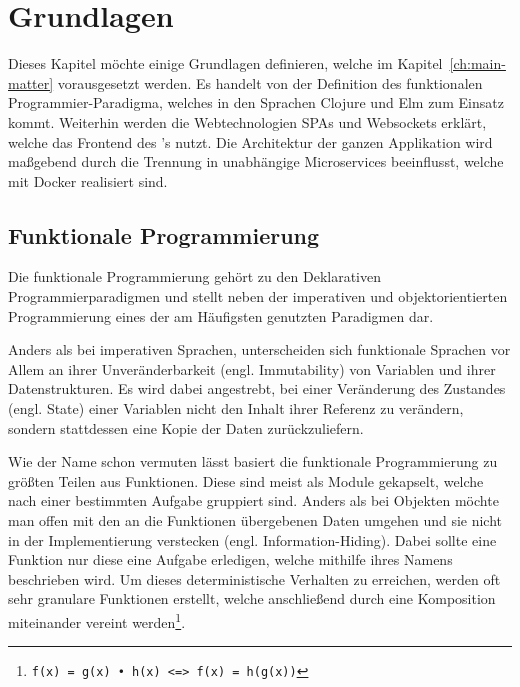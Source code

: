 \chapter{Grundlagen}
\label{ch:fundamentals}

Dieses Kapitel möchte einige Grundlagen definieren, welche im Kapitel~\ref{ch:main-matter} vorausgesetzt werden.
Es handelt von der Definition des funktionalen Programmier-Paradigma, welches in den Sprachen Clojure und Elm zum Einsatz kommt.
Weiterhin werden die Webtechnologien \acp{SPA} und Websockets erklärt, welche das Frontend des 's nutzt. 
Die Architektur der ganzen Applikation wird maßgebend durch die Trennung in unabhängige Microservices beeinflusst, welche mit Docker realisiert sind.
\section{Funktionale Programmierung}
Die funktionale Programmierung gehört zu den Deklarativen Programmierparadigmen und stellt neben der imperativen und objektorientierten Programmierung eines der am Häufigsten genutzten Paradigmen dar.
\par
Anders als bei imperativen Sprachen, unterscheiden sich funktionale Sprachen vor Allem an ihrer Unveränderbarkeit (engl. Immutability) von Variablen und ihrer Datenstrukturen.
Es wird dabei angestrebt, bei einer Veränderung des Zustandes (engl. State) einer Variablen nicht den Inhalt ihrer Referenz zu verändern, sondern stattdessen eine Kopie der Daten zurückzuliefern.
\par
Wie der Name schon vermuten lässt basiert die funktionale Programmierung zu größten Teilen aus Funktionen. 
Diese sind meist als Module gekapselt, welche nach einer bestimmten Aufgabe gruppiert sind. 
Anders als bei Objekten möchte man offen mit den an die Funktionen übergebenen Daten umgehen und sie nicht in der Implementierung verstecken (engl. Information-Hiding). 
Dabei sollte eine Funktion nur diese eine Aufgabe erledigen, welche mithilfe ihres Namens beschrieben wird. 
Um dieses deterministische Verhalten zu erreichen, werden oft sehr granulare Funktionen erstellt, welche anschließend durch eine Komposition miteinander vereint werden\footnote{\texttt{f(x) = g(x) • h(x) <=> f(x) = h(g(x))}}.
